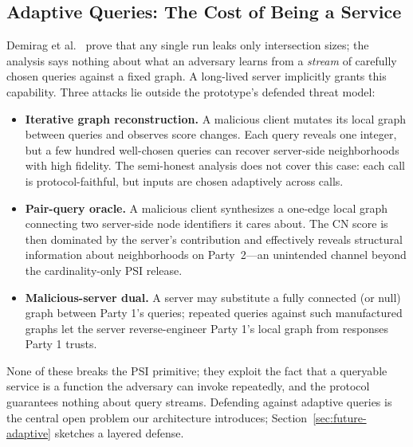 \documentclass[sigconf]{acmart}
\begin{document}
\subsection{Adaptive Queries: The Cost of Being a Service}
\label{sec:adaptive-queries}
Demirag et al.~\cite{Demirag2022} prove that any single run leaks only intersection sizes; the analysis says nothing about what an adversary learns from a \emph{stream} of carefully chosen queries against a fixed graph. A long-lived server implicitly grants this capability. Three attacks lie outside the prototype's defended threat model:

\begin{itemize}
  \item \textbf{Iterative graph reconstruction.} A malicious client mutates its local graph between queries and observes score changes. Each query reveals one integer, but a few hundred well-chosen queries can recover server-side neighborhoods with high fidelity. The semi-honest analysis does not cover this case: each call is protocol-faithful, but inputs are chosen adaptively across calls.
  \item \textbf{Pair-query oracle.} A malicious client synthesizes a one-edge local graph connecting two server-side node identifiers it cares about. The CN score is then dominated by the server's contribution and effectively reveals structural information about neighborhoods on Party~2---an unintended channel beyond the cardinality-only PSI release.
  \item \textbf{Malicious-server dual.} A server may substitute a fully connected (or null) graph between Party 1's queries; repeated queries against such manufactured graphs let the server reverse-engineer Party 1's local graph from responses Party 1 trusts.
\end{itemize}

None of these breaks the PSI primitive; they exploit the fact that a queryable service is a function the adversary can invoke repeatedly, and the protocol guarantees nothing about query streams. Defending against adaptive queries is the central open problem our architecture introduces; Section~\ref{sec:future-adaptive} sketches a layered defense.
\end{document}
